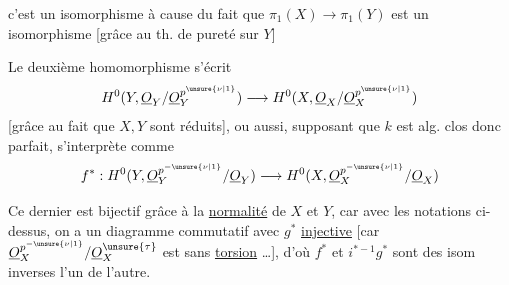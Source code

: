c'est un isomorphisme à cause du fait que
$\pi_1(X)\to\pi_1(Y)$ est un isomorphisme
[grâce au th. de pureté sur $Y$]

Le deuxième homomorphisme s'écrit
\[
H^0(Y,\underline O_Y/\underline O_Y^{p^{\unsure{\nu|1}}})
\longrightarrow
H^0(X,\underline O_X/\underline O_X^{p^{\unsure{\nu|1}}})
\]
[grâce au fait que $X,Y$ sont réduits],
ou aussi, supposant que $k$ est alg. clos donc parfait,
s'interprète comme
\[
f^*:H^0(Y,\underline O_Y^{p^{-\unsure{\nu|1}}}/\underline O_Y)
\longrightarrow
H^0(X,\underline O_X^{p^{-\unsure{\nu|1}}}/\underline O_X)
\]

Ce dernier est bijectif grâce à la \uline{normalité} de $X$ et $Y$,
car  avec les notations ci-dessus, on a un
diagramme commutatif
avec $g^*$ \uline{injective}
[car $\underline O_X^{p^{-\unsure{\nu|1}}}/
\underline O_X^{\unsure{\tau}}$ est 
sans \uline{torsion} \ldots],
d'où $f^*$ et $i^{*-1}g^*$ sont des isom inverses l'un de l'autre.
